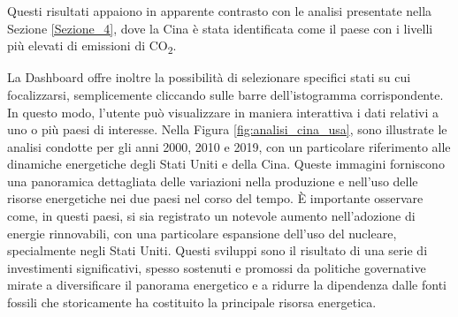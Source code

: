 Questi risultati appaiono in apparente contrasto con le analisi presentate nella Sezione \ref{Sezione_4}, dove la Cina è stata identificata come il paese con i livelli più elevati di emissioni di CO\textsubscript{2}.

La Dashboard offre inoltre la possibilità di selezionare specifici stati su cui focalizzarsi, semplicemente cliccando sulle barre dell'istogramma corrispondente. In questo modo, l'utente può visualizzare in maniera interattiva i dati relativi a uno o più paesi di interesse. Nella Figura \ref{fig:analisi_cina_usa}, sono illustrate le analisi condotte per gli anni 2000, 2010 e 2019, con un particolare riferimento alle dinamiche energetiche degli Stati Uniti e della Cina. Queste immagini forniscono una panoramica dettagliata delle variazioni nella produzione e nell'uso delle risorse energetiche nei due paesi nel corso del tempo.
È importante osservare come, in questi paesi, si sia registrato un notevole aumento nell'adozione di energie rinnovabili, con una particolare espansione dell'uso del nucleare, specialmente negli Stati Uniti. Questi sviluppi sono il risultato di una serie di investimenti significativi, spesso sostenuti e promossi da politiche governative mirate a diversificare il panorama energetico e a ridurre la dipendenza dalle fonti fossili che storicamente ha costituito la principale risorsa energetica.


